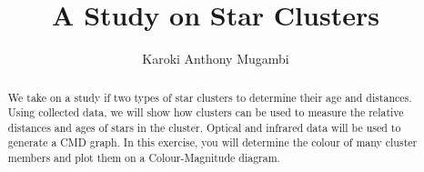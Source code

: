 \documentclass[12pt, twocolumn]{aastex62}
\begin{document}
\title{A Study on Star Clusters}




\author{Karoki Anthony Mugambi}









\begin{abstract}
	We take on a study if two types of star clusters to determine their age and distances. Using collected data, we will show how clusters can be used to measure the relative distances and ages of stars in the cluster. Optical and infrared data will be used to generate a CMD graph. In this exercise, you will determine the colour of many cluster members and plot them on a Colour-Magnitude diagram.%
\end{abstract}
\end{document}
